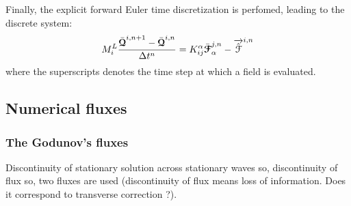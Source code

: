 Finally, the explicit forward Euler time discretization is perfomed, leading to the discrete system:
\begin{equation}
  \label{eq:DGMPM_discrete}
  M^L_i \frac{\bar{{\boldsymbol{\mathcal{Q}}}}^{i,n+1} - \bar{{\boldsymbol{\mathcal{Q}}}}^{i,n}}{\Delta t^{n} } = K^\alpha_{ij} \bar{{\boldsymbol{\mathcal{F}}}}_{\alpha}^{j,n}- {\overrightarrow{\hat{\mathcal{F}}}}^{i,n}  
\end{equation}
where the superscripts denotes the time step at which a field is evaluated.


\subsection{Numerical fluxes}
\subsubsection*{The Godunov's fluxes}

Discontinuity of stationary solution across stationary waves so, discontinuity of flux so, two fluxes are used (discontinuity of flux means loss of information. Does it correspond to transverse correction ?).
